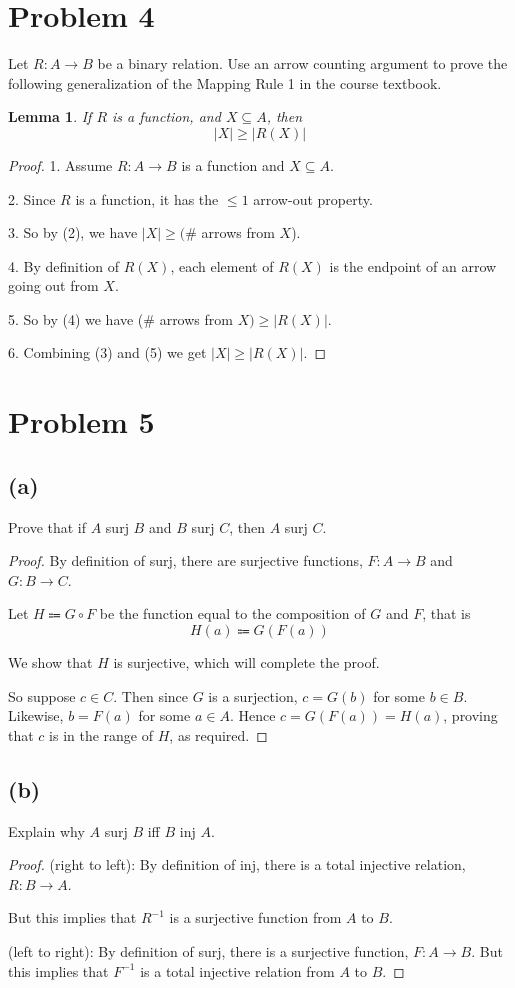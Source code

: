 \documentclass[14pt]{extarticle}
\newtheorem{lemma}{Lemma}
\begin{document}
\section{Problem 4}
Let $R : A \to B$ be a binary relation. Use an arrow counting argument to prove the following generalization of the Mapping Rule 1 in the course textbook.

\begin{lemma}
If $R$ is a function, and $X \subseteq A$, then
$$
|X| \geq |R(X)|
$$
\end{lemma}

\begin{proof}
1. Assume $R: A \to B$ is a function and $X \subseteq A$.

2. Since $R$ is a function, it has the $\leq 1$ arrow-out property. 

3. So by (2), we have $|X| \geq (\#$ arrows from $X$).

4. By definition of $R(X)$, each element of $R(X)$ is the endpoint of an arrow going out from $X$. 

5. So by (4) we have ($\#$ arrows from $X) \geq |R(X)|$.

6. Combining (3) and (5) we get $|X| \geq |R(X)|$.
\end{proof}

\section{Problem 5}
\subsection{(a)}
Prove that if $A$ surj $B$ and $B$ surj $C$, then $A$ surj $C$.
\begin{proof}
By definition of surj, there are surjective functions, $F : A \to B$ and $G : B \to C$.

Let $H \Coloneqq G \circ F$ be the function equal to the composition of $G$ and $F$, that is 
$$
H(a) \Coloneqq G(F(a))
$$

We show that $H$ is surjective, which will complete the proof. 

So suppose $c \in C$. Then since $G$ is a surjection, $c = G(b)$ for some $b \in B$. Likewise, $b = F (a)$ for some $a \in A$. Hence $c = G(F (a)) = H(a)$, proving that $c$ is in the range of $H$, as required.
\end{proof}

\subsection{(b)}
Explain why $A$ surj $B$ iff $B$ inj $A$.
\begin{proof}
(right to left): By definition of inj, there is a total injective relation, $R: B \to A$.

But this implies that $R^{-1}$ is a surjective function from $A$ to $B$.

(left to right): By definition of surj, there is a surjective function, $F: A \to B$. But this implies that $F^{-1}$ is a total injective relation from $A$ to $B$.
\end{proof}
\end{document}
